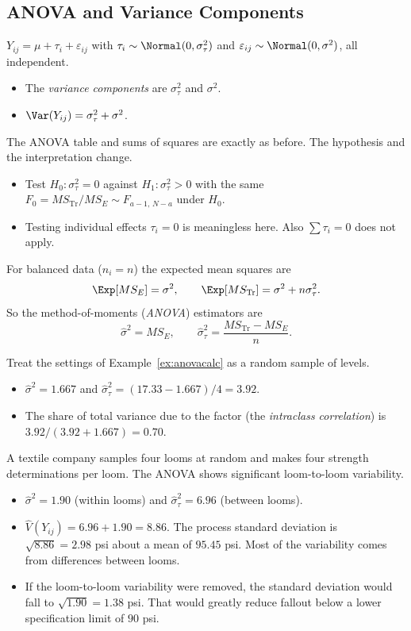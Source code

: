\subsection{ANOVA and Variance Components}

\begin{definition}
$Y_{ij}=\mu+\tau_i+\varepsilon_{ij}$ with $\tau_i\sim\Normal(0,\sigma_\tau^2)$ and $\varepsilon_{ij}\sim\Normal(0,\sigma^2)$, all independent.
\begin{itemize}
  \item The \emph{variance components} are $\sigma_\tau^2$ and $\sigma^2$.
  \item $\Var(Y_{ij})=\sigma_\tau^2+\sigma^2$.
\end{itemize}
\end{definition}

The ANOVA table and sums of squares are exactly as before. The hypothesis and the interpretation change.
\begin{itemize}
  \item Test $H_0:\sigma_\tau^2=0$ against $H_1:\sigma_\tau^2>0$ with the same $F_0=MS_{\mathrm{Tr}}/MS_E\sim F_{a-1,\,N-a}$ under $H_0$.
  \item Testing individual effects $\tau_i=0$ is meaningless here. Also $\sum\tau_i=0$ does not apply.
\end{itemize}
For balanced data ($n_i=n$) the expected mean squares are
\[ \Exp[MS_E]=\sigma^2,\qquad\Exp[MS_{\mathrm{Tr}}]=\sigma^2+n\sigma_\tau^2. \]
So the method-of-moments (\emph{ANOVA}) estimators are
\[ \hat\sigma^2=MS_E,\qquad\hat\sigma_\tau^2=\frac{MS_{\mathrm{Tr}}-MS_E}n. \]

\begin{example}
Treat the settings of Example~\ref{ex:anovacalc} as a random sample of levels.
\begin{itemize}
  \item $\hat\sigma^2=1.667$ and $\hat\sigma_\tau^2=(17.33-1.667)/4=3.92$.
  \item The share of total variance due to the factor (the \emph{intraclass correlation}) is $3.92/(3.92+1.667)=0.70$.
\end{itemize}
\end{example}

\begin{example}[Looms]
A textile company samples four looms at random and makes four strength determinations per loom. The ANOVA shows significant loom-to-loom variability.
\begin{itemize}
  \item $\hat\sigma^2=1.90$ (within looms) and $\hat\sigma_\tau^2=6.96$ (between looms).
  \item $\widehat{V}(Y_{ij})=6.96+1.90=8.86$. The process standard deviation is $\sqrt{8.86}=2.98$ psi about a mean of $95.45$ psi. Most of the variability comes from differences between looms.
  \item If the loom-to-loom variability were removed, the standard deviation would fall to $\sqrt{1.90}=1.38$ psi. That would greatly reduce fallout below a lower specification limit of $90$ psi.
\end{itemize}
\end{example}

